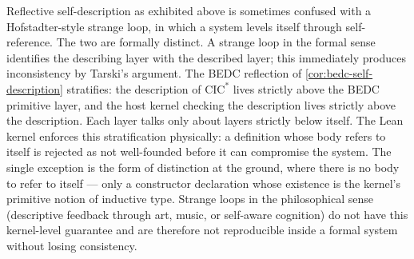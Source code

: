 \begin{remark}
\label{rem:reflection-distinction-from-strange-loop}
Reflective self-description as exhibited above is sometimes confused with a Hofstadter-style strange loop, in which a system levels itself through self-reference. The two are formally distinct. A strange loop in the formal sense identifies the describing layer with the described layer; this immediately produces inconsistency by Tarski's argument. The BEDC reflection of \autoref{cor:bedc-self-description} stratifies: the description of $\mathrm{CIC}^{*}$ lives strictly above the BEDC primitive layer, and the host kernel checking the description lives strictly above the description. Each layer talks only about layers strictly below itself. The Lean kernel enforces this stratification physically: a definition whose body refers to itself is rejected as not well-founded before it can compromise the system. The single exception is the form of distinction at the ground, where there is no body to refer to itself --- only a constructor declaration whose existence is the kernel's primitive notion of inductive type. Strange loops in the philosophical sense (descriptive feedback through art, music, or self-aware cognition) do not have this kernel-level guarantee and are therefore not reproducible inside a formal system without losing consistency.
\end{remark}

